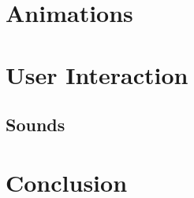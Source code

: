 \documentclass[12pt,a4paper]{article}
\begin{document}
\section{Animations}\label{anim}
\section{User Interaction} \label{user}
\subsection{Sounds}
\section{Conclusion}
\end{document}

